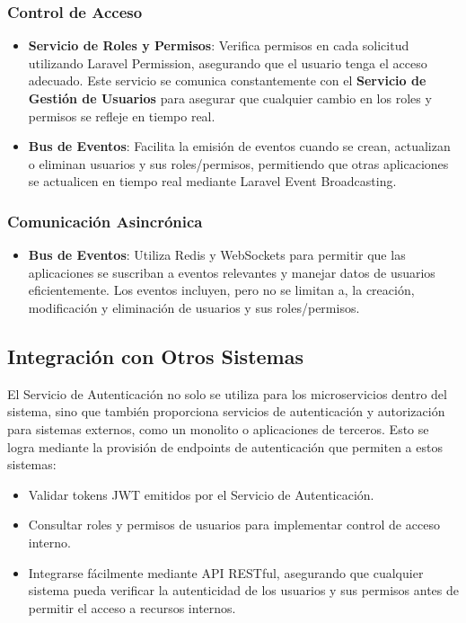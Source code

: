 \documentclass{article}
\begin{document}
\subsubsection{Control de Acceso}
\begin{itemize}
    \item \textbf{Servicio de Roles y Permisos}: Verifica permisos en cada solicitud utilizando Laravel Permission, asegurando que el usuario tenga el acceso adecuado. Este servicio se comunica constantemente con el \textbf{Servicio de Gestión de Usuarios} para asegurar que cualquier cambio en los roles y permisos se refleje en tiempo real.
    \item \textbf{Bus de Eventos}: Facilita la emisión de eventos cuando se crean, actualizan o eliminan usuarios y sus roles/permisos, permitiendo que otras aplicaciones se actualicen en tiempo real mediante Laravel Event Broadcasting.
\end{itemize}

\subsubsection{Comunicación Asincrónica}
\begin{itemize}
    \item \textbf{Bus de Eventos}: Utiliza Redis y WebSockets para permitir que las aplicaciones se suscriban a eventos relevantes y manejar datos de usuarios eficientemente. Los eventos incluyen, pero no se limitan a, la creación, modificación y eliminación de usuarios y sus roles/permisos.
\end{itemize}

\subsection{Integración con Otros Sistemas}

El Servicio de Autenticación no solo se utiliza para los microservicios dentro del sistema, sino que también proporciona servicios de autenticación y autorización para sistemas externos, como un monolito o aplicaciones de terceros. Esto se logra mediante la provisión de endpoints de autenticación que permiten a estos sistemas:
\begin{itemize}
    \item Validar tokens JWT emitidos por el Servicio de Autenticación.
    \item Consultar roles y permisos de usuarios para implementar control de acceso interno.
    \item Integrarse fácilmente mediante API RESTful, asegurando que cualquier sistema pueda verificar la autenticidad de los usuarios y sus permisos antes de permitir el acceso a recursos internos.
\end{itemize}
\end{document}
